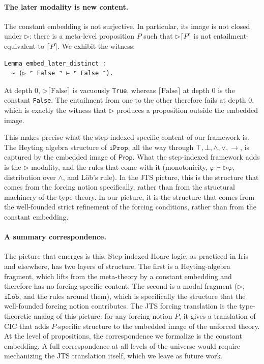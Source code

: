 \paragraph{The later modality is new content.}
The constant embedding is not surjective.  In particular, its image
is not closed under $\triangleright$: there is a meta-level
proposition $P$ such that $\triangleright \lceil P \rceil$ is not
entailment-equivalent to $\lceil P \rceil$.  We exhibit the
witness:

\begin{lstlisting}
Lemma embed_later_distinct :
  ~ (▷ ⌜ False ⌝ ⊢ ⌜ False ⌝).
\end{lstlisting}

\noindent
At depth $0$, $\triangleright \lceil \mathrm{False} \rceil$ is
vacuously \texttt{True}, whereas $\lceil \mathrm{False} \rceil$ at
depth $0$ is the constant \texttt{False}.  The entailment from one to
the other therefore fails at depth $0$, which is exactly the
witness that $\triangleright$ produces a proposition outside the
embedded image.

This makes precise what the step-indexed-specific content of our
framework is.  The Heyting algebra structure of $\mathtt{iProp}$,
all the way through $\top, \bot, \wedge, \vee, \to$, is
captured by the embedded image of $\mathsf{Prop}$.  What the
step-indexed framework adds is the $\triangleright$ modality, and
the rules that come with it (monotonicity, $\varphi \vdash
\triangleright \varphi$, distribution over $\wedge$, and Löb's
rule).  In the JTS picture, this is the structure that comes from
the forcing notion specifically, rather than from the structural
machinery of the type theory. In our picture, it is the structure
that comes from the well-founded strict refinement of the forcing
conditions, rather than from the constant embedding.

\paragraph{A summary correspondence.}
The picture that emerges is this.  Step-indexed Hoare logic, as
practiced in Iris and elsewhere, has two layers of structure.  The
first is a Heyting-algebra fragment, which lifts from the meta-theory
by a constant embedding and therefore has no forcing-specific content.
The second is a modal fragment ($\triangleright$, $\mathtt{iLob}$, and
the rules around them), which is specifically the structure that the
well-founded forcing notion contributes.  The JTS forcing
translation is the type-theoretic analog of this picture: for any
forcing notion $P$, it gives a translation of CIC that adds
$P$-specific structure to the embedded image of the unforced
theory.  At the level of propositions, the correspondence we
formalize is the constant embedding.  A full correspondence at all
levels of the universe would require mechanizing the JTS
translation itself, which we leave as future work.

